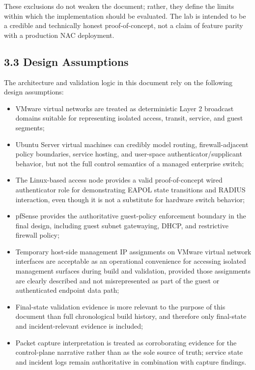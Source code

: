 \documentclass[11pt]{article}
\begin{document}
These exclusions do not weaken the document; rather, they define the limits within which the implementation should be evaluated. The lab is intended to be a credible and technically honest proof-of-concept, not a claim of feature parity with a production NAC deployment.


\subsection{3.3 Design Assumptions}
\label{sec:design-assumptions}

The architecture and validation logic in this document rely on the following design assumptions:

\begin{itemize}
    \item VMware virtual networks are treated as deterministic Layer 2 broadcast domains suitable for representing isolated access, transit, service, and guest segments;
    \item Ubuntu Server virtual machines can credibly model routing, firewall-adjacent policy boundaries, service hosting, and user-space authenticator/supplicant behavior, but not the full control semantics of a managed enterprise switch;
    \item The Linux-based access node provides a valid proof-of-concept wired authenticator role for demonstrating EAPOL state transitions and RADIUS interaction, even though it is not a substitute for hardware switch behavior;
    \item pfSense provides the authoritative guest-policy enforcement boundary in the final design, including guest subnet gatewaying, DHCP, and restrictive firewall policy;
    \item Temporary host-side management IP assignments on VMware virtual network interfaces are acceptable as an operational convenience for accessing isolated management surfaces during build and validation, provided those assignments are clearly described and not misrepresented as part of the guest or authenticated endpoint data path;
    \item Final-state validation evidence is more relevant to the purpose of this document than full chronological build history, and therefore only final-state and incident-relevant evidence is included;
    \item Packet capture interpretation is treated as corroborating evidence for the control-plane narrative rather than as the sole source of truth; service state and incident logs remain authoritative in combination with capture findings.
\end{itemize}
\end{document}
